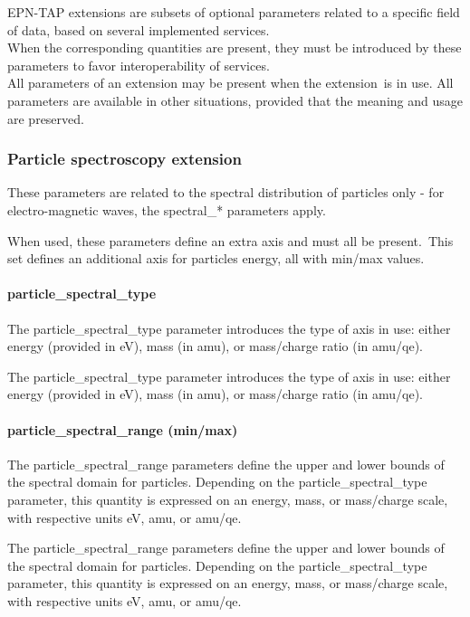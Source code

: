 \documentclass[11pt,a4paper]{ivoa}
\begin{document}
EPN-TAP extensions are subsets of optional parameters related to a specific field of data, based on several implemented services.\\When the corresponding quantities are present, they must be introduced by these parameters to favor interoperability of services.\\All parameters of an extension may be present when the extension is in use. All parameters are available in other situations, provided that the meaning and usage are preserved. 

\subsubsection{Particle spectroscopy extension}

These parameters are related to the spectral distribution of particles only - for electro-magnetic waves, the spectral\_* parameters apply.

When used, these parameters define an extra axis and must all be present. This set defines an additional axis for particles energy, all with min/max values.

\paragraph{particle\_spectral\_type}

The particle\_spectral\_type parameter introduces the type of axis in use: either energy (provided in eV), mass (in amu), or mass/charge ratio (in amu/qe).

The particle\_spectral\_type parameter introduces the type of axis in use: either energy (provided in eV), mass (in amu), or mass/charge ratio (in amu/qe).

\paragraph{particle\_spectral\_range (min/max)}

The particle\_spectral\_range parameters define the upper and lower bounds of the spectral domain for particles. Depending on the particle\_spectral\_type parameter, this quantity is expressed on an energy, mass, or mass/charge scale, with respective units eV, amu, or amu/qe.

The particle\_spectral\_range parameters define the upper and lower bounds of the spectral domain for particles. Depending on the particle\_spectral\_type parameter, this quantity is expressed on an energy, mass, or mass/charge scale, with respective units eV, amu, or amu/qe.
\end{document}

